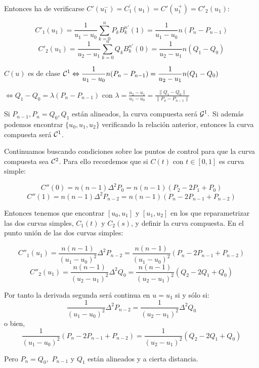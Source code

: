 \documentclass[twoside]{report}
\begin{document}
Entonces ha de verificarse $C'(u_1^{-})=C^{\prime}_1(u_1)=C'(u_1^{+})=C'_2(u_1):$

$$C'_1(u_1)=\frac{1}{u_1-u_0}\sum_{k=0}^n P_k B_k^{n \prime}(1)=\frac{1}{u_1-u_0} n(P_n-P_{n-1})$$
$$C'_2(u_1)=\frac{1}{u_2-u_1}\sum_{k=0}^n Q_k B_k^{n \prime}(0)=\frac{1}{u_2-u_1} n (Q_1-Q_0)$$

$C(u)$ es de clase $\displaystyle {\cal C}^1 \Leftrightarrow \frac{1}{u_1-u_0} n(P_n-P_{n-1})=\frac{1}{u_2-u_1} n (Q_1-Q_0)$

\vspace{0.2cm}

$\displaystyle \Leftrightarrow Q_1-Q_0 = \lambda (P_n-P_{n-1})$ con $\displaystyle \lambda = \frac{u_2-u_1}{u_1-u_0} = \frac{\parallel Q_1-Q_0\parallel}{\parallel P_n-P_{n-1} \parallel}$

\vspace{0.2cm}

Si $P_{n-1}, P_n=Q_0, Q_1$ están alineados, la curva compuesta será ${\cal G}^1.$ Si además podemos encontrar $\{u_0,u_1,u_2\}$ verificando la relación anterior, entonces la curva compuesta será ${\cal C}^1$.

%
%
Continuamos buscando condiciones sobre los puntos de control para que la curva compuesta  sea ${\cal C}^2$. Para ello recordemos que si $C(t)$ con $t\in[0,1]$ es curva simple:

$$C''(0)=n(n-1)\Delta^2P_0=n (n-1) (P_2-2P_1+P_0)$$
$$C''(1)=n(n-1)\Delta^2P_{n-2}=n (n-1) (P_n-2P_{n-1}+P_{n-2})$$

Entonces tenemos que encontrar $[u_0,u_1]$ y $[u_1,u_2]$ en los que reparametrizar las dos curvas simples, $C_1(t)$ y $C_2(s)$, y definir la curva compuesta. En el punto unión de las dos curvas simples:

$$C''_1(u_1)=\frac{n(n-1)}{(u_1-u_0)^2}\Delta^2P_{n-2}=\frac{n(n-1)}{(u_1-u_0)^2}(P_n-2P_{n-1}+P_{n-2})$$
$$C''_2(u_1)=\frac{n(n-1)}{(u_2-u_1)^2}\Delta^2Q_0=\frac{n(n-1)}{(u_2-u_1)^2}(Q_2-2Q_1+Q_0)$$

Por tanto la derivada segunda será continua en $u=u_1$ si y sólo si:
$$\frac{1}{(u_1-u_0)^2}\Delta^2P_{n-2}=\frac{1}{(u_2-u_1)^2}\Delta^2Q_0$$
o bien,
$$\frac{1}{(u_1-u_0)^2}(P_n-2P_{n-1}+P_{n-2})=\frac{1}{(u_2-u_1)^2}(Q_2-2Q_1+Q_0)$$

Pero $P_n=Q_0,$ $P_{n-1}$ y $Q_1$ están alineados y a cierta distancia.
\end{document}
